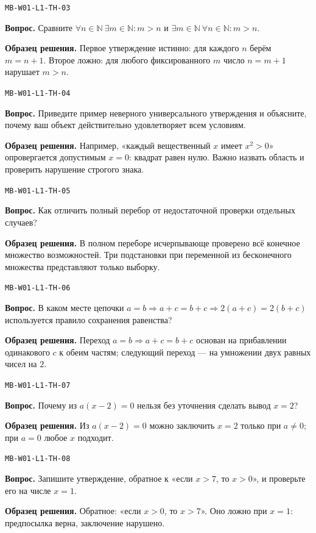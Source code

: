 \documentclass[11pt,a4paper,openany]{book}
\newcommand{\muid}[1]{\texttt{\footnotesize #1}}
\begin{document}
\noindent\muid{MB-W01-L1-TH-03}\par \textbf{Вопрос.} Сравните $\forall n\in\mathbb N\ \exists m\in\mathbb N\colon m>n$ и $\exists m\in\mathbb N\ \forall n\in\mathbb N\colon m>n$.\par 
\textbf{Образец решения.} Первое утверждение истинно: для каждого $n$ берём $m=n+1$. Второе ложно: для любого фиксированного $m$ число $n=m+1$ нарушает $m>n$.\medskip

\noindent\muid{MB-W01-L1-TH-04}\par \textbf{Вопрос.} Приведите пример неверного универсального утверждения и объясните, почему ваш объект действительно удовлетворяет всем условиям.\par 
\textbf{Образец решения.} Например, «каждый вещественный $x$ имеет $x^2>0$» опровергается допустимым $x=0$: квадрат равен нулю. Важно назвать область и проверить нарушение строгого знака.\medskip

\noindent\muid{MB-W01-L1-TH-05}\par \textbf{Вопрос.} Как отличить полный перебор от недостаточной проверки отдельных случаев?\par 
\textbf{Образец решения.} В полном переборе исчерпывающе проверено всё конечное множество возможностей. Три подстановки при переменной из бесконечного множества представляют только выборку.\medskip

\noindent\muid{MB-W01-L1-TH-06}\par \textbf{Вопрос.} В каком месте цепочки $a=b\Rightarrow a+c=b+c\Rightarrow 2(a+c)=2(b+c)$ используется правило сохранения равенства?\par 
\textbf{Образец решения.} Переход $a=b\Rightarrow a+c=b+c$ основан на прибавлении одинакового $c$ к обеим частям; следующий переход — на умножении двух равных чисел на $2$.\medskip

\noindent\muid{MB-W01-L1-TH-07}\par \textbf{Вопрос.} Почему из $a(x-2)=0$ нельзя без уточнения сделать вывод $x=2$?\par 
\textbf{Образец решения.} Из $a(x-2)=0$ можно заключить $x=2$ только при $a\ne0$; при $a=0$ любое $x$ подходит.\medskip

\noindent\muid{MB-W01-L1-TH-08}\par \textbf{Вопрос.} Запишите утверждение, обратное к «если $x>7$, то $x>0$», и проверьте его на числе $x=1$.\par 
\textbf{Образец решения.} Обратное: «если $x>0$, то $x>7$». Оно ложно при $x=1$: предпосылка верна, заключение нарушено.\medskip
\end{document}
